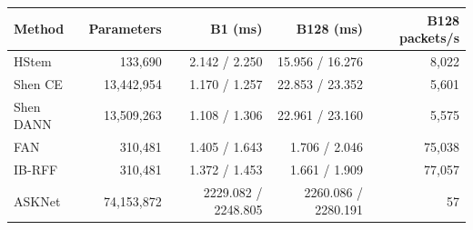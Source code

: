 \begin{tabular}{lrrrr}
\toprule Method & Parameters & B1 (ms) & B128 (ms) & B128 packets/s\\
\midrule
HStem & 133,690 & 2.142 / 2.250 & 15.956 / 16.276 & 8,022\\
Shen CE & 13,442,954 & 1.170 / 1.257 & 22.853 / 23.352 & 5,601\\
Shen DANN & 13,509,263 & 1.108 / 1.306 & 22.961 / 23.160 & 5,575\\
FAN & 310,481 & 1.405 / 1.643 & 1.706 / 2.046 & 75,038\\
IB-RFF & 310,481 & 1.372 / 1.453 & 1.661 / 1.909 & 77,057\\
ASKNet & 74,153,872 & 2229.082 / 2248.805 & 2260.086 / 2280.191 & 57\\
\bottomrule
\end{tabular}
